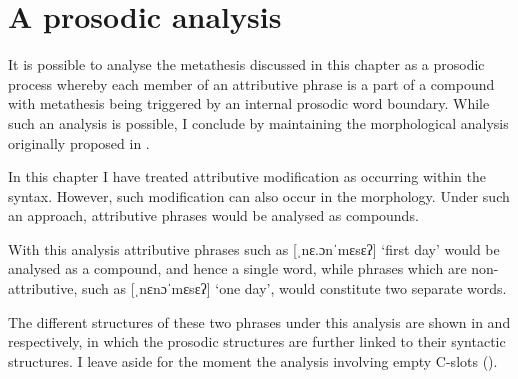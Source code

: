 \section{A prosodic analysis}\label{sec:ProsMet}
It is possible to analyse the metathesis discussed in this chapter
as a prosodic process whereby each member
of an attributive phrase is a part of a compound
with metathesis being triggered by an internal prosodic word boundary.
While such an analysis is possible, I conclude by maintaining
the morphological analysis originally proposed in .

In this chapter I have treated attributive modification as occurring within the syntax.
However, such modification can also occur in the morphology.
Under such an approach, attributive phrases would be analysed as compounds.

With this analysis attributive phrases
such as  [ˌnɛ.ɔnˈmɛsɛʔ] `first day'
would be analysed as a compound, and hence a single word,
while phrases which are non-attributive,
such as  [ˌnɛnɔˈmɛsɛʔ] `one day',
would constitute two separate words.

The different structures of these two phrases under
this analysis are shown in 
and  respectively,
in which the prosodic structures are further
linked to their syntactic structures.
I leave aside for the moment the analysis
involving empty C-slots ().

